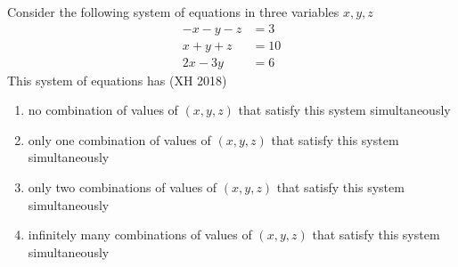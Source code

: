    \item Consider the following system of equations in three variables $x, y, z$
  \begin{align*}
    -x - y - z &= 3 \\
    x + y + z &= 10 \\
    2x - 3y &= 6
  \end{align*}
  This system of equations has
  \hfill(XH 2018)
  \begin{enumerate}
    \item no combination of values of $(x, y, z)$ that satisfy this system simultaneously
    \item only one combination of values of $(x, y, z)$ that satisfy this system simultaneously
    \item only two combinations of values of $(x, y, z)$ that satisfy this system simultaneously
    \item infinitely many combinations of values of $(x, y, z)$ that satisfy this system simultaneously
  \end{enumerate}
